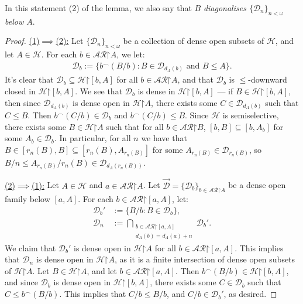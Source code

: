 \documentclass[11pt,reqno]{amsart}
\theoremstyle{plain}
\numberwithin{equation}{section}
\theoremstyle{definition}
\newcommand{\cal}{\mathcal}
\newcommand{\restrictedto}{\mathord{\upharpoonright}}
\renewcommand{\H}{\cal{H}}
\newcommand{\D}{\cal{D}}
\begin{document}
In this statement (2) of the lemma, we also say that $B$ \emph{diagonalises $\{\D_n\}_{n<\omega}$ below $A$}.

\begin{proof}
    \underline{(1)$\implies$(2):} Let $\{\D_n\}_{n<\omega}$ be a collection of dense open subsets of $\H$, and let $A \in \H$. For each $b \in \cal{AR}\restrictedto A$, we let:
    \begin{align*}
        \D_b := \{b^\frown(B/b) : B \in \D_{d_A(b)} \text{ and } B \leq A\}.
    \end{align*}
    It's clear that $\D_b \subseteq \H\restrictedto[b,A]$ for all $b \in \cal{AR}\restrictedto A$, and that $\D_b$ is $\leq$-downward closed in $\H\restrictedto[b,A]$. We see that $\D_b$ is dense in $\H\restrictedto[b,A]$ --- if $B \in \H\restrictedto[b,A]$, then since $\D_{d_A(b)}$ is dense open in $\H\restrictedto A$, there exists some $C \in \D_{d_A(b)}$ such that $C \leq B$. Then $b^\frown(C/b) \in \D_b$ and $b^\frown(C/b) \leq B$. Since $\H$ is semiselective, there exists some $B \in \H\restrictedto A$ such that for all $b \in \cal{AR}\restrictedto B$, $[b,B] \subseteq [b,A_b]$ for some $A_b \in \D_b$. In particular, for all $n$ we have that $B \in [r_n(B),B] \subseteq [r_n(B),A_{r_n(B)}]$ for some $A_{r_n(B)} \in \D_{r_n(B)}$, so $B/n \leq A_{r_n(B)}/r_n(B) \in \D_{d_A(r_n(B))}$.

    \underline{(2)$\implies$(1):} Let $A \in \H$ and $a \in \cal{AR}\restrictedto A$. Let $\vec{\D} = \{\D_b\}_{b \in \cal{AR}\restrictedto A}$ be a dense open family below $[a,A]$. For each $b \in \cal{AR}\restrictedto[a,A]$, let:
    \begin{align*}
        \D_b' &:= \{B/b : B \in \D_b\}, \\
        \D_n &:= \bigcap_{\substack{b \in \cal{AR}\restrictedto[a,A] \\ d_A(b) = d_A(a) + n}} \D_b'.
    \end{align*}
    We claim that $\D_b'$ is dense open in $\H\restrictedto A$ for all $b \in \cal{AR}\restrictedto[a,A]$. This implies that $\D_n$ is dense open in $\H\restrictedto A$, as it is a finite intersection of dense open subsets of $\H\restrictedto A$. Let $B \in \H\restrictedto A$, and let $b \in \cal{AR}\restrictedto[a,A]$. Then $b^\frown(B/b) \in \H\restrictedto[b,A]$, and since $\D_b$ is dense open in $\H\restrictedto[b,A]$, there exists some $C \in \D_b$ such that $C \leq b^\frown(B/b)$. This implies that $C/b \leq B/b$, and $C/b \in \D_b'$, as desired.


\end{proof}
\end{document}
